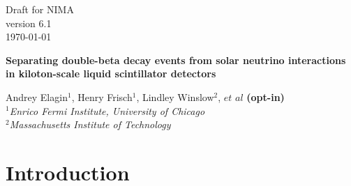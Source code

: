 \documentclass[12pt,twoside,letterpaper]{article}
\newcommand{\vbb}{0\nu\beta\beta}
\newcommand{\B}{^{8}B}
\begin{document}
\vspace*{-3.5cm}
\begin{flushright}
Draft for NIMA\\
version 6.1\\
\today
\end{flushright}



\begin{center}
  \begin{Large}
  {\bf Separating double-beta decay events from solar neutrino interactions in kiloton-scale liquid scintillator detectors}
  \end{Large}
\end{center}


\begin{center}
Andrey Elagin$^1$, Henry Frisch$^1$, Lindley Winslow$^2$, $et$ $al$ {\bf (opt-in)}\\
\emph{$^1$Enrico Fermi Institute, University of Chicago\\ 
$^2$Massachusetts Institute of Technology}
\end{center}



\begin{abstract}
We propose a technique for separating $\vbb$-decay events from background due to $\B$ solar neutrino interactions in a liquid scintillator detector. The technique compares event topology of the signal and background events using spherical harmonics analysis of the early light emitted in $\vbb$-decay and $\B$ events. Selection of early photons using fast photo-detectors allows for separation of directional Cherenkov from isotropic scintillation light and identification of two event topologies based on the spatial distribution of the early photons in the detector.
\end{abstract}

\newpage
\tableofcontents
\newpage





\section{Introduction}
\end{document}
